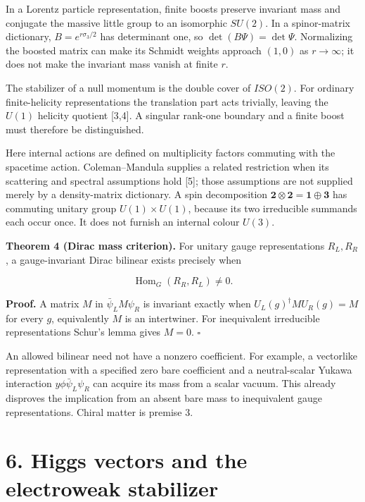 \documentclass[
  11pt,
  a4paper,
]{article}
\begin{document}
In a Lorentz particle representation, finite boosts preserve invariant mass and conjugate the massive little group to an isomorphic \(SU(2)\). In a spinor-matrix dictionary, \(B=e^{r\sigma_3/2}\) has determinant one, so \(\det(B\Psi)=\det\Psi\). Normalizing the boosted matrix can make its Schmidt weights approach \((1,0)\) as \(r\to\infty\); it does not make the invariant mass vanish at finite \(r\).

The stabilizer of a null momentum is the double cover of \(ISO(2)\). For ordinary finite-helicity representations the translation part acts trivially, leaving the \(U(1)\) helicity quotient {[}3,4{]}. A singular rank-one boundary and a finite boost must therefore be distinguished.

Here internal actions are defined on multiplicity factors commuting with the spacetime action. Coleman--Mandula supplies a related restriction when its scattering and spectral assumptions hold {[}5{]}; those assumptions are not supplied merely by a density-matrix dictionary. A spin decomposition \(\mathbf2\otimes\mathbf2=\mathbf1\oplus\mathbf3\) has commuting unitary group \(U(1)\times U(1)\), because its two irreducible summands each occur once. It does not furnish an internal colour \(U(3)\).

\textbf{Theorem 4 (Dirac mass criterion).} For unitary gauge representations \(R_L,R_R\), a gauge-invariant Dirac bilinear exists precisely when

\[
 \operatorname{Hom}_G(R_R,R_L)\ne0.
\]

\textbf{Proof.} A matrix \(M\) in \(\bar\psi_LM\psi_R\) is invariant exactly when \(U_L(g)^\dagger M U_R(g)=M\) for every \(g\), equivalently \(M\) is an intertwiner. For inequivalent irreducible representations Schur's lemma gives \(M=0\). \(\square\)

An allowed bilinear need not have a nonzero coefficient. For example, a vectorlike representation with a specified zero bare coefficient and a neutral-scalar Yukawa interaction \(y\phi\bar\psi_L\psi_R\) can acquire its mass from a scalar vacuum. This already disproves the implication from an absent bare mass to inequivalent gauge representations. Chiral matter is premise 3.

\section{6. Higgs vectors and the electroweak stabilizer}\label{higgs-vectors-and-the-electroweak-stabilizer}
\end{document}
